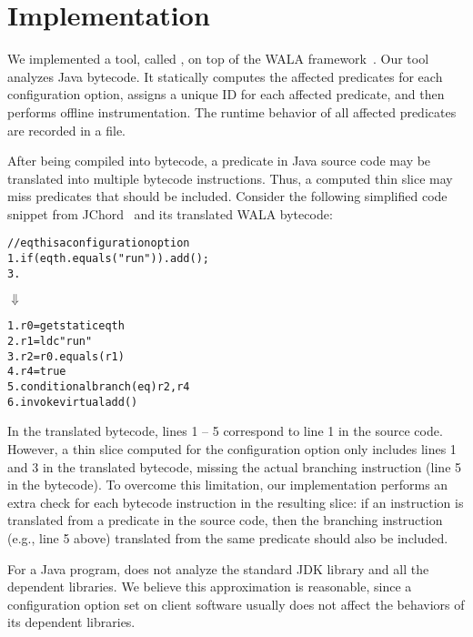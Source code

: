 \section{Implementation}
\label{sec:implementation}

We implemented a tool, called \ourtool, on top of the WALA
framework~\cite{wala}. Our tool analyzes Java bytecode.
It statically computes the affected predicates
for each configuration option, assigns a unique
ID for each affected predicate, and then performs offline instrumentation.
The runtime behavior of all affected predicates are recorded
in a file. 



After being compiled into bytecode,
a predicate in Java source code may be translated into multiple bytecode
instructions. Thus, a computed thin slice may
miss predicates that should be included.
Consider the following simplified code snippet from JChord~\cite{jchord}
and its translated WALA bytecode:


\begin{CodeOut}
\begin{alltt}
   // eqth is a configuration option 
1. if (eqth.equals("run")) .   add();
3. \ttrcb
\end{alltt}
\end{CodeOut}
\vspace{-2mm}
\hspace{20mm}$\Downarrow$ 
\begin{CodeOut}
\begin{alltt}
1. r0 = getstatic eqth
2. r1 = ldc "run"
3. r2 = r0.equals(r1)
4. r4 = true
5. conditional branch(eq) r2, r4
6. invokevirtual add() 
\end{alltt}
\end{CodeOut}

In the translated bytecode, lines 1 -- 5 correspond to line 1 in the
source code. However, a thin slice computed
for the configuration option  only includes lines 1 and 3
in the translated bytecode, missing the actual branching
instruction (line 5 in the bytecode).
To overcome this limitation, our implementation performs an extra check
for each bytecode instruction in the resulting slice:
if an instruction 
is translated from a predicate in the source code, then the
branching instruction (e.g., line 5 above) translated
from the same predicate should also be included.


For a Java program, \ourtool does not analyze the standard JDK
library and all the dependent libraries. We believe this approximation
is reasonable, since a configuration option set on client software
usually does not affect the behaviors of its dependent libraries.

